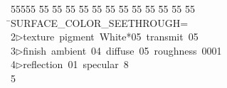 %
%
\begin{tabbing}
55555 \= 55 \= 55 \= 55 \= 55 \= 55 \= 55 \= 55 \= 55 \= 55 \= 55 \= 55 \= 55 \= \>SURFACE\_COLOR\_SEETHROUGH=\\[0pt]
2\>$\triangleright$\>texture\ pigment\ White*05\ transmit\ 05\ \ \\[0pt]
3\>$\triangleright$\>finish\ ambient\ 04\ diffuse\ 05\ roughness\ 0001\ \\[0pt]
4\>$\triangleright$\>reflection\ 01\ specular\ 8\ \\[0pt]
5\>\end{tabbing}
